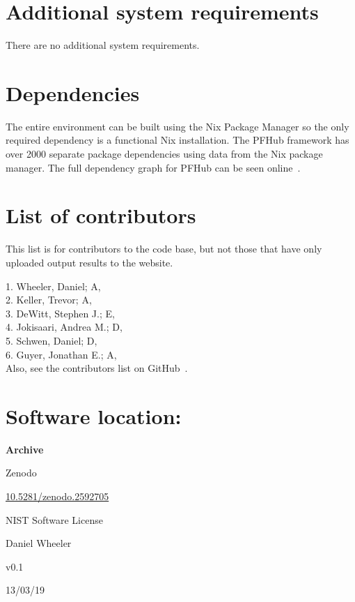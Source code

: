 \documentclass{jors}
\begin{document}
\section*{Additional system requirements}

There are no additional system requirements.

\section*{Dependencies}

The entire environment can be built using the Nix Package Manager so
the only required dependency is a functional Nix installation. The
PFHub framework has over 2000 separate package dependencies using
data from the Nix package manager. The full dependency graph for PFHub
can be seen online~\cite{dependencies}.

\section*{List of contributors}

This list is for contributors to the code base, but not those that
have only uploaded output results to the website.

1. Wheeler, Daniel; A,  \\
2. Keller, Trevor; A,  \\
3. DeWitt, Stephen J.; E,  \\
4. Jokisaari, Andrea M.; D,  \\
5. Schwen, Daniel; D,  \\
6. Guyer, Jonathan E.; A,  \\

Also, see the contributors list on GitHub~\cite{contributors}.

\section*{Software location:}

{\bf Archive}

\begin{description}[noitemsep,topsep=0pt]
	\item[Name:] Zenodo
	\item[Persistent identifier:]
          \href{https://dx.doi.org/10.5281/zenodo.2592705}{10.5281/zenodo.2592705}
	\item[Licence:] NIST Software License~\cite{nistlicense}
	\item[Publisher:]  Daniel Wheeler
	\item[Version published:] v0.1
	\item[Date published:] 13/03/19
\end{description}
\end{document}
